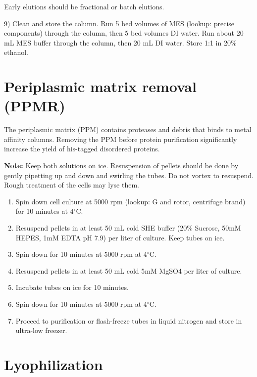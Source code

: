 \begin{enumerate}
Early elutions should be fractional or batch elutions.

9) Clean and store the column. Run 5 bed volumes of MES (lookup: precise components) through the column, then 5 bed volumes DI water. 
Run about 20 mL MES buffer through the column, then 20 mL DI water.  Store 1:1 in 20\% ethanol.

\end{enumerate}

\section{Periplasmic matrix removal (PPMR)}
\label{sec:ppmr}

The periplasmic matrix (PPM) contains proteases and debris that binds to metal affinity columns.  Removing the PPM before protein purification significantly increase the yield of his-tagged disordered proteins.

\textbf{Note:} Keep both solutions on ice.  Resuspension of pellets should be done by gently pipetting up and down and swirling the tubes.  Do not vortex to resuspend.  Rough treatment of the cells may lyse them.

\begin{enumerate}

\item Spin down cell culture at 5000 rpm (lookup: G and rotor, centrifuge brand) for 10 minutes at 4$^\circ$C.

\item Resuspend pellets in at least 50 mL cold SHE buffer (20\% Sucrose, 50mM HEPES, 1mM EDTA pH 7.9) per liter of culture.  Keep tubes on ice.

\item Spin down for 10 minutes at 5000 rpm at 4$^\circ$C.

\item Resuspend pellets in at least 50 mL cold 5mM MgSO4 per liter of culture.

\item Incubate tubes on ice for 10 minutes.

\item Spin down for 10 minutes at 5000 rpm at 4$^\circ$C.

\item Proceed to purification or flash-freeze tubes in liquid nitrogen and store in ultra-low freezer.
\end{enumerate}

\section{Lyophilization}

